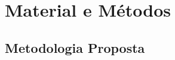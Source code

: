 \documentclass[%
  10pt,%
  aspectratio = 169,%
  compress,%
  t,%
  english,%
  brazilian,%
  tikz,
]{beamer}
\begin{document}



\section{Material e Métodos}\label{sec:matmet}

\subsection{Metodologia Proposta}\label{ssec:matmet1}
\end{document}
